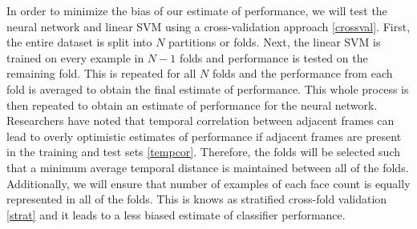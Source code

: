 \documentclass[12pt]{article}
\begin{document}
In order to minimize the bias of our estimate of performance, we will test the neural network and linear SVM using a cross-validation approach \ref{crossval}.
First, the entire dataset is split into $N$ partitions or folds.
Next, the linear SVM is trained on every example in $N-1$ folds and performance is tested on the remaining fold.
This is repeated for all $N$ folds and the performance from each fold is averaged to obtain the final estimate of performance.
This whole process is then repeated to obtain an estimate of performance for the neural network.
Researchers have noted that temporal correlation between adjacent frames can lead to overly optimistic estimates of performance if adjacent frames are present in the training and test sets \ref{tempcor}.
Therefore, the folds will be selected such that a minimum average temporal distance is maintained between all of the folds.
Additionally, we will ensure that number of examples of each face count is equally represented in all of the folds.
This is knows as stratified cross-fold validation \ref{strat} and it leads to a less biased estimate of classifier performance.




\end{document}
